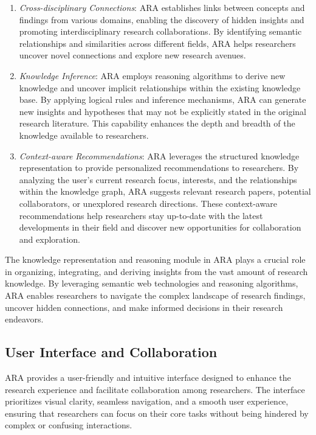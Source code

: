 \documentclass[a4paper,conference]{IEEEtran}
\begin{document}
\begin{enumerate}
\item \textit{Cross-disciplinary Connections}: ARA establishes links between concepts and findings from various domains, enabling the discovery of hidden insights and promoting interdisciplinary research collaborations. By identifying semantic relationships and similarities across different fields, ARA helps researchers uncover novel connections and explore new research avenues.

\item \textit{Knowledge Inference}: ARA employs reasoning algorithms to derive new knowledge and uncover implicit relationships within the existing knowledge base. By applying logical rules and inference mechanisms, ARA can generate new insights and hypotheses that may not be explicitly stated in the original research literature. This capability enhances the depth and breadth of the knowledge available to researchers.

\item \textit{Context-aware Recommendations}: ARA leverages the structured knowledge representation to provide personalized recommendations to researchers. By analyzing the user's current research focus, interests, and the relationships within the knowledge graph, ARA suggests relevant research papers, potential collaborators, or unexplored research directions. These context-aware recommendations help researchers stay up-to-date with the latest developments in their field and discover new opportunities for collaboration and exploration.
\end{enumerate}

The knowledge representation and reasoning module in ARA plays a crucial role in organizing, integrating, and deriving insights from the vast amount of research knowledge. By leveraging semantic web technologies and reasoning algorithms, ARA enables researchers to navigate the complex landscape of research findings, uncover hidden connections, and make informed decisions in their research endeavors.

\subsection{User Interface and Collaboration}
ARA provides a user-friendly and intuitive interface designed to enhance the research experience and facilitate collaboration among researchers. The interface prioritizes visual clarity, seamless navigation, and a smooth user experience, ensuring that researchers can focus on their core tasks without being hindered by complex or confusing interactions.
\end{document}
